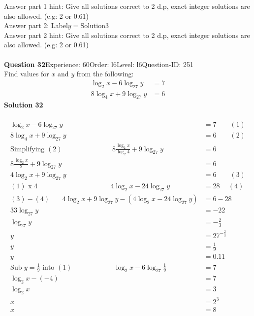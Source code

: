 \documentclass{article}
\begin{document}
Answer part 1 hint: \hspace{15pt}Give all solutions correct to 2 d.p, exact integer solutions are also allowed. (e.g: 2 or 0.61)\\
Answer part 2: \hspace{10pt}Label\hspace{10pt}$y=$\hspace{10pt}Solution\hspace{10pt}3\\
Answer part 2 hint: \hspace{15pt}Give all solutions correct to 2 d.p, exact integer solutions are also allowed. (e.g: 2 or 0.61)\\
\\[4pt]
\noindent\textbf{Question 32}\hspace{20pt}Experience: 60\hspace{20pt}Order: l6\hspace{20pt}Level: l6\hspace{20pt}Question-ID: 251\\[2pt]
Find values for $x$ and $y$ from the following:
\begin{align*}
\log_{2}x-6\log_{27}y&=7\\[2pt]
8\log_{4}x+9\log_{27}y&=6
\end{align*}
\noindent\textbf{Solution 32}\\[2pt]
\\[-35pt]\begin{align*}
\log_{2}x-6\log_{27}y&=7\qquad (1)\\[2pt]
8\log_{4}x+9\log_{27}y&=6\qquad (2)\\[2pt]
\text{Simplifying}\,\,(2)\hspace{87pt}8\displaystyle\frac{\log_{2}x}{\log_{2}4}+9\log_{27}y&=6\\[2pt]
8\displaystyle\frac{\log_{2}x}{2}+9\log_{27}y&=6\\[2pt]
4\log_{2}x+9\log_{27}y&=6\qquad (3)\\[2pt]
(1)\,\,\text{x}\,\,4\hspace{127pt} 4\log_{2}x-24\log_{27}y&=28\hspace{15pt} (4)\\[2pt]
(3)-(4)\hspace{22pt}4\log_{2}x+9\log_{27}y-(4\log_{2}x-24\log_{27}y)&=6-28\\[2pt]
33\log_{27}y&=-22\\[2pt]
\log_{27}y&=-\displaystyle\frac{2}{3}\\[2pt]
y&=27^{-\frac{2}{3}}\\[2pt]
y&=\displaystyle\frac{1}{9}\\[2pt]
y&=0.11\\[12pt]
\text{Sub}\,\,y=\displaystyle\frac{1}{9}\,\,\text{into}\,\,(1)\hspace{73pt}\log_{2}x-6\log_{27}\displaystyle\frac{1}{9}&=7\\[2pt]
\log_{2}x-(-4)&=7\\[2pt]
\log_{2}x&=3\\[2pt]
x&=2^3\\[2pt]
x&=8
\end{align*}
\end{document}
